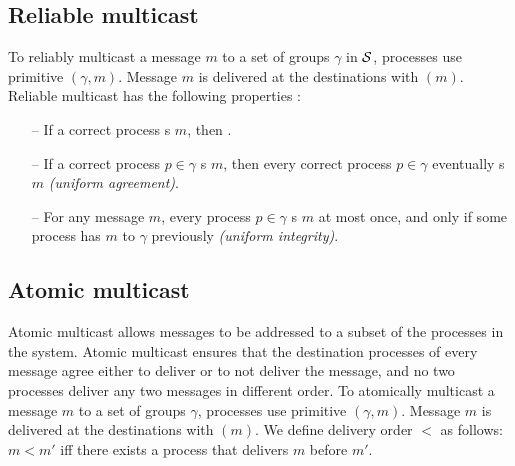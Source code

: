 \subsection{Reliable multicast}
\label{sec:rmcast}
To reliably multicast a message $m$ to a set of groups $\gamma$ in $\mathcal{S}$, processes use
primitive \rmcast$(\gamma, m)$.  Message $m$ is delivered at the destinations
with \rmdel$(m)$.  Reliable multicast has the following properties \cite{hadzilacos1994modular}:

\begin{itemize}

    \item[--] If a correct process \rmcast{}s $m$, then .

    \item[--] If a correct process $p \in \gamma$ \rmdel{}s $m$, then every correct
      process $p \in \gamma$ eventually \rmdel{}s $m$ \emph{(uniform agreement)}.

    \item[--] For any message $m$, every process $p \in \gamma$ \rmdel{}s $m$
      at most once, and only if some process has \rmcast{} $m$ to $\gamma$
      previously \emph{(uniform integrity)}.

\end{itemize}

\subsection{Atomic multicast}
\label{sec:amcast}
Atomic multicast allows messages to be addressed to a subset of the processes in
the system. Atomic multicast ensures that the destination processes of every
message agree either to deliver or to not deliver the message, and no two
processes deliver any two messages in different order. To atomically multicast a
message $m$ to a set of groups $\gamma$, processes use primitive
\amcast$(\gamma, m)$.  Message $m$ is delivered at the destinations with
\amdel$(m)$.  We define delivery order $<$ as follows: $m < m'$ iff there exists
a process that delivers $m$ before $m'$.


